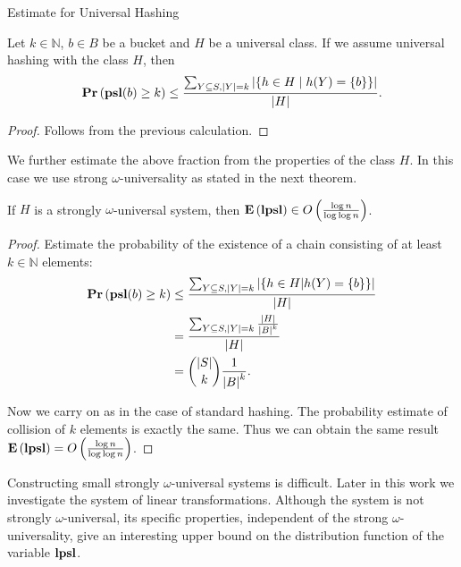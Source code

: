 \begin{section}{Estimate for Universal Hashing}
\begin{claim}
Let $k \in \mathbb{N}$, $b \in B$ be a bucket and $H$ be a universal class. If we assume universal hashing with the class $H$, then
\[
	\mathbf{Pr}\left(\mathbf{psl}(b) \geq k\right) \leq \frac{\sum\displaylimits_{Y \subseteq S, |Y| = k} | \{ h \in H \mid h(Y) = \{ b \} \}|}{|H|} \text{.}
\]
\end{claim}
\begin{proof}
Follows from the previous calculation.
\end{proof}

We further estimate the above fraction from the properties of the class $H$. In this case we use strong $\omega$-universality as stated in the next theorem.

\begin{theorem}
If $H$ is a strongly $\omega$-universal system, then $\mathbf{E}\left(\mathbf{lpsl}\right) \in O\left(\frac{\log n}{\log \log n}\right)$.
\end{theorem}
\begin{proof}
Estimate the probability of the existence of a chain consisting of at least $k \in \mathbb{N}$ elements:
\begin{displaymath}
\begin{split}
\mathbf{Pr}\left(\mathbf{psl}(b) \geq k\right)
	& \leq \frac{\sum\displaylimits_{Y \subseteq S, |Y| = k} | \{ h \in H | h(Y) = \{b\} \}|}{|H|} \\
	& = \frac{\sum\displaylimits_{Y \subseteq S, |Y| = k} \frac{|H|}{{|B|}^{k}}}{|H|} \\
	& = \dbinom{|S|}{k}\frac{1}{{|B|}^k} \text{.}
\end{split}
\end{displaymath}

Now we carry on as in the case of standard hashing. The probability estimate of collision of $k$ elements is exactly the same. Thus we can obtain the same result $\mathbf{E}\left(\mathbf{lpsl}\right) = O\left(\frac{\log n}{\log \log n}\right)$.
\end{proof}

Constructing small strongly $\omega$-universal systems is difficult. Later in this work we investigate the system of linear transformations. Although the system is not strongly $\omega$-universal, its specific properties, independent of the strong $\omega$-universality, give an interesting upper bound on the distribution function of the variable $\mathbf{lpsl}$.
\end{section}
